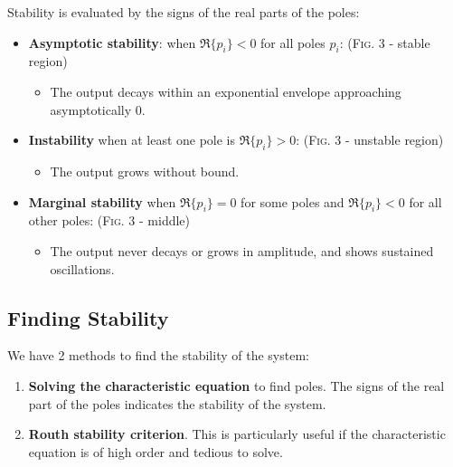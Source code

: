 Stability is evaluated by the signs of the real parts of the poles:
\begin{itemize}
    \item \textbf{Asymptotic stability}: when $\Re\{p_{i}\} < 0 $ for all poles $p_{i}$: (\textsc{Fig. 3} - stable region)
        \begin{itemize}
            \item The output decays within an exponential envelope approaching asymptotically 0. 
        \end{itemize}
        
    \item \textbf{Instability} when at least one pole is $\Re\{p_{i}\} >0$: (\textsc{Fig. 3} - unstable region)
        \begin{itemize}
            \item The output grows without bound. 
        \end{itemize}
        
    \item \textbf{Marginal stability} when $\Re\{p_{i}\} =0$ for some poles and $\Re\{p_{i}\} <0$ for all other poles: (\textsc{Fig. 3} - middle)
        \begin{itemize}
            \item The output never decays or grows in amplitude, and shows sustained oscillations. 
        \end{itemize}
\end{itemize}
\subsection{Finding Stability}
We have 2 methods to find the stability of the system:
\begin{enumerate}
    \item \textbf{Solving the characteristic equation} to find poles. The signs of the real part of the poles indicates the stability of the system.
    \item \textbf{Routh stability criterion}. This is particularly useful if the characteristic equation is of high order and tedious to solve.
\end{enumerate}

